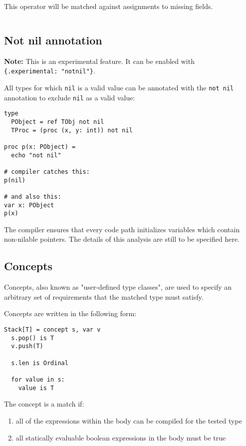 This operator will be matched against assignments to missing fields.

\begin{verbatim}
\end{verbatim}

\hypertarget{not-nil-annotation}{%
\subsection{Not nil annotation}\label{not-nil-annotation}}

\textbf{Note:} This is an experimental feature. It can be enabled with
\texttt{\{.experimental:\ "notnil"\}}.

All types for which \texttt{nil} is a valid value can be annotated with
the \texttt{not\ nil} annotation to exclude \texttt{nil} as a valid
value:

\begin{verbatim}
type
  PObject = ref TObj not nil
  TProc = (proc (x, y: int)) not nil

proc p(x: PObject) =
  echo "not nil"

# compiler catches this:
p(nil)

# and also this:
var x: PObject
p(x)
\end{verbatim}

The compiler ensures that every code path initializes variables which
contain non-nilable pointers. The details of this analysis are still to
be specified here.

\hypertarget{concepts}{%
\subsection{Concepts}\label{concepts}}

Concepts, also known as "user-defined type classes", are used to specify
an arbitrary set of requirements that the matched type must satisfy.

Concepts are written in the following form:

\begin{verbatim}
Stack[T] = concept s, var v
  s.pop() is T
  v.push(T)

  s.len is Ordinal

  for value in s:
    value is T
\end{verbatim}

The concept is a match if:

\begin{enumerate}
\def\labelenumi{\alph{enumi})}
\tightlist
\item
  all of the expressions within the body can be compiled for the tested
  type
\item
  all statically evaluable boolean expressions in the body must be true
\end{enumerate}

